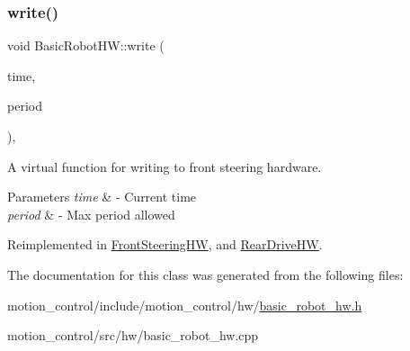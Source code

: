 \mbox{\label{classBasicRobotHW_a62add5eabfca2f88a5035db8b8240bb3}} 
\subsubsection{\texorpdfstring{write()}{write()}}
{\footnotesize\ttfamily void Basic\+Robot\+H\+W\+::write (\begin{DoxyParamCaption}\item[{const ros\+::\+Time \&}]{time,  }\item[{const ros\+::\+Duration \&}]{period }\end{DoxyParamCaption})\hspace{0.3cm}{\ttfamily [override]}, {\ttfamily [virtual]}}



A virtual function for writing to front steering hardware. 


\begin{DoxyParams}{Parameters}
{\em time} & -\/ Current time \\
\hline
{\em period} & -\/ Max period allowed \\
\hline
\end{DoxyParams}


Reimplemented in \hyperlink{classFrontSteeringHW_aa0e57cc4919044aecb7d1c76c8d4ac21}{Front\+Steering\+HW}, and \hyperlink{classRearDriveHW_a36461317b3f595464ef080259bc21fae}{Rear\+Drive\+HW}.



The documentation for this class was generated from the following files\+:\begin{DoxyCompactItemize}
\item 
motion\+\_\+control/include/motion\+\_\+control/hw/\hyperlink{basic__robot__hw_8h}{basic\+\_\+robot\+\_\+hw.\+h}\item 
motion\+\_\+control/src/hw/basic\+\_\+robot\+\_\+hw.\+cpp\end{DoxyCompactItemize}
